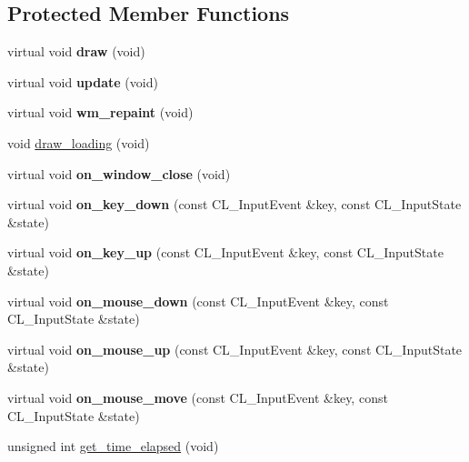 \subsection*{Protected Member Functions}
\begin{DoxyCompactItemize}
\item 
\hypertarget{classApplicationModule_a8976aad9f18518a03d83be61283d9b6e}{
virtual void {\bfseries draw} (void)}
\label{classApplicationModule_a8976aad9f18518a03d83be61283d9b6e}

\item 
\hypertarget{classApplicationModule_a1bfe895c2c5f3d14e32973db2ec51723}{
virtual void {\bfseries update} (void)}
\label{classApplicationModule_a1bfe895c2c5f3d14e32973db2ec51723}

\item 
\hypertarget{classApplicationModule_ac182827a21ffdafb13327e24c3aff773}{
virtual void {\bfseries wm\_\-repaint} (void)}
\label{classApplicationModule_ac182827a21ffdafb13327e24c3aff773}

\item 
void \hyperlink{classApplicationModule_a2fb74c01602d0a030eb7335543580be3}{draw\_\-loading} (void)
\item 
\hypertarget{classApplicationModule_ad21cf0501238dd52bbe4c84606f6cb91}{
virtual void {\bfseries on\_\-window\_\-close} (void)}
\label{classApplicationModule_ad21cf0501238dd52bbe4c84606f6cb91}

\item 
\hypertarget{classApplicationModule_aec7e75cf19261da574bc0f238b430738}{
virtual void {\bfseries on\_\-key\_\-down} (const CL\_\-InputEvent \&key, const CL\_\-InputState \&state)}
\label{classApplicationModule_aec7e75cf19261da574bc0f238b430738}

\item 
\hypertarget{classApplicationModule_acbff2a3dc36d72449a47ac0bb139719b}{
virtual void {\bfseries on\_\-key\_\-up} (const CL\_\-InputEvent \&key, const CL\_\-InputState \&state)}
\label{classApplicationModule_acbff2a3dc36d72449a47ac0bb139719b}

\item 
\hypertarget{classApplicationModule_a59c95ac03dc85010f132d5bbb628a481}{
virtual void {\bfseries on\_\-mouse\_\-down} (const CL\_\-InputEvent \&key, const CL\_\-InputState \&state)}
\label{classApplicationModule_a59c95ac03dc85010f132d5bbb628a481}

\item 
\hypertarget{classApplicationModule_a1017f6c73e46f9e2167ad71960bece8d}{
virtual void {\bfseries on\_\-mouse\_\-up} (const CL\_\-InputEvent \&key, const CL\_\-InputState \&state)}
\label{classApplicationModule_a1017f6c73e46f9e2167ad71960bece8d}

\item 
\hypertarget{classApplicationModule_a8da8b878817e13200ec732306ae412d9}{
virtual void {\bfseries on\_\-mouse\_\-move} (const CL\_\-InputEvent \&key, const CL\_\-InputState \&state)}
\label{classApplicationModule_a8da8b878817e13200ec732306ae412d9}

\item 
unsigned int \hyperlink{classApplicationModule_ab6e817b3b78e6563a446fae8e8abefb6}{get\_\-time\_\-elapsed} (void)
\end{DoxyCompactItemize}
